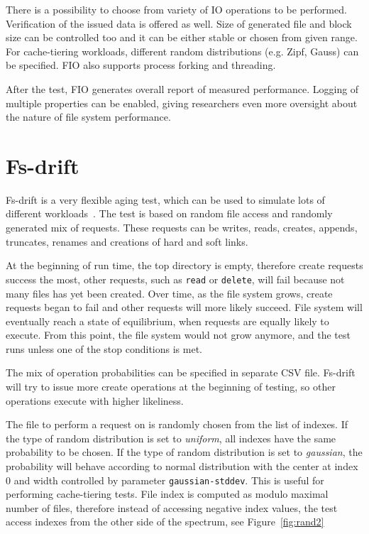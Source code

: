 \documentclass[
  color, %
  table, %
  lof,   %
  lot,   %
]{fithesis3}
\begin{document}
There is a possibility to choose from variety of IO operations to be performed. Verification of the issued data is offered as well. Size of generated file and block size can be controlled too and it can be either stable or chosen from given range. For cache-tiering workloads, different random distributions (e.g. Zipf, Gauss) can be specified. FIO also supports process forking and threading.

After the test, FIO generates overall report of measured performance. Logging of multiple properties can be enabled, giving researchers even more oversight about the nature of file system performance.

\section{Fs-drift}
Fs-drift is a very flexible aging test, which can be used to simulate lots of different workloads~\cite{fs-drift:github}. The test is based on random file access and randomly generated mix of requests. These requests can be writes, reads, creates, appends, truncates, renames and creations of hard and soft links.

At the beginning of run time, the top directory is empty, therefore create requests success the most, other requests, such as \texttt{read} or \texttt{delete}, will fail because not many files has yet been created. Over time, as the file system grows, create requests began to fail and other requests will more likely succeed. File system will eventually reach a state of equilibrium, when requests are equally likely to execute. From this point, the file system would not grow anymore, and the test runs unless one of the stop conditions is met.

The mix of operation probabilities can be specified in separate CSV file. Fs-drift will try to issue more create operations at the beginning of testing, so other operations execute with higher likeliness.

The file to perform a request on is randomly chosen from the list of indexes. If the type of random distribution is set to \emph{uniform}, all indexes have the same probability to be chosen. If the type of random distribution is set to \emph{gaussian}, the probability will behave according to normal distribution with the center at index 0 and width controlled by parameter \texttt{gaussian-stddev}. This is useful for performing cache-tiering tests. File index is computed as modulo maximal number of files, therefore instead of accessing negative index values, the test access indexes from the other side of the spectrum, see Figure~\ref{fig:rand2}
\end{document}
